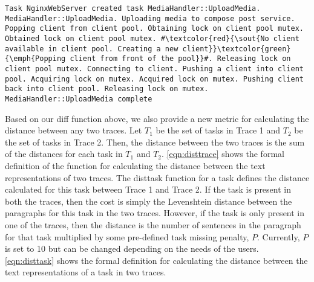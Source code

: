 \begin{lstlisting}[caption={Text Difference for a task from 2 traces},captionpos=b,label={fig:taskdiff}, escapechar=\#]
    Task NginxWebServer created task MediaHandler::UploadMedia. MediaHandler::UploadMedia. Uploading media to compose post service. Popping client from client pool. Obtaining lock on client pool mutex. Obtained lock on client pool mutex. #\textcolor{red}{\sout{No client available in client pool. Creating a new client}}\textcolor{green}{\emph{Popping client from front of the pool}}#. Releasing lock on client pool mutex. Connecting to client. Pushing a client into client pool. Acquiring lock on mutex. Acquired lock on mutex. Pushing client back into client pool. Releasing lock on mutex. MediaHandler::UploadMedia complete
\end{lstlisting}

 Based on our diff function above, we also provide a new metric for calculating
the distance between any two traces. Let $T_1$ be the set of tasks in Trace 1 and $T_2$ be the set
of tasks in Trace 2. Then, the distance between the two traces is the sum of the distances for each task
in $T_1$ and $T_2$. \autoref{eqn:disttrace} shows the formal definition of the function for calculating
the distance between the text representations of two traces.
The disttask function for a task defines the distance calculated for this task between Trace 1 and Trace 2.
If the task is present in both the traces, then the cost is simply the Levenshtein distance between the paragraphs
for this task in the two traces. However, if the task is only present in one of the traces, then the distance is
the number of sentences in the paragraph for that task multiplied by some pre-defined task missing penalty, $P$.
Currently, $P$ is set to 10 but can be changed depending on the needs of the users. \autoref{eqn:disttask}
shows the formal definition for calculating the distance between the text representations of a task in two traces.
